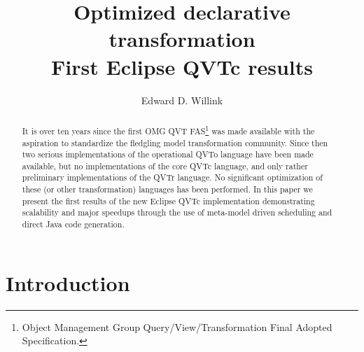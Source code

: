 \documentclass{llncs}
\begin{document}
%
\frontmatter          %
%
\pagestyle{headings}  %
%


%
\mainmatter              %
%
\title{Optimized declarative transformation\\First Eclipse QVTc results}
%
%
\author{Edward D. Willink}
%
%
%

\maketitle              %

\begin{abstract}
It is over ten years since the first OMG QVT FAS\footnote{Object Management Group Query/View/Transformation Final Adopted Specification.} was made available with the aspiration to standardize the fledgling model transformation community. Since then two serious implementations of the operational QVTo language have been made available, but no implementations of the core QVTc language, and only rather preliminary implementations of the QVTr language. No significant optimization of these (or other transformation) languages has been performed. In this paper we present the first results of the new Eclipse QVTc implementation demonstrating scalability and major speedups through the use of meta-model driven scheduling and direct Java code generation.
\end{abstract}
%

\section{Introduction}
\end{document}
